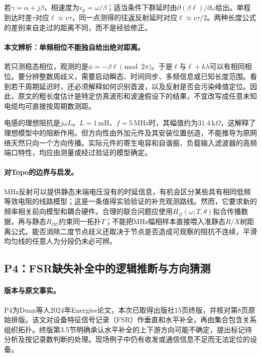 若$\gamma=\alpha+j\beta$，相速度为$v_p=\omega/\beta$；适当条件下群延时由$\partial(\beta\ell)/\partial\omega$给出。单程到达时差$\tau$对应$\ell\approx v\tau$，同一点测得的往返反射延时对应$\ell\approx v\tau/2$。两种长度公式的差别来自走过的距离不同，而不是经验修正。

\paragraph{本文辨析：单频相位不能独自给出绝对距离。}
若只测稳态相位，观测的是$\phi=-\beta\ell\pmod{2\pi}$。于是$\ell$与$\ell+k\lambda$可以有相同相位。要分辨整数周歧义，需要启动瞬态、时间同步、多频信息或已知长度范围。看到若干周期延迟时，还必须解释如何识别首波，以及反射是否会污染峰值定位。因此，原文的粗长度估计是特定仿真波形和波速假设下的结果，不宜改写成任意未知电缆均可直接按周期数测距。

电感的理想阻抗是$j\omega L$。$L=1$\,mH、$f=5$\,MHz时，其幅值约为$31.4$\,k$\Omega$，这解释了理想模型中的阻断作用。但方向性由外加元件及其安装位置创造，不能推导为原网络天然只向一个方向传播。实际元件的寄生电容和自谐振、负载输入滤波器的高频端口特性，均应由测量或经过验证的模型确定。

\paragraph{对Topo的边界与启发。}
MHz反射可以提供静态末端电压没有的时延信息，有机会区分某些具有相同低频等效电阻的线路模型；这是一条值得实验验证的补充观测路线。然而，它要求新的频率相关前向模型和耦合硬件。合理的联合问题应使用$H_{ij}(\omega;T,\theta)$拟合传播数据，再与静态$R_{\mathcal O\mathcal O}$约束同一拓扑$T$；不能把MHz幅相样本直接喂入准静态$R/X$树距离公式。能否消除二度节点歧义还取决于节点是否造成可观察的阻抗不连续，平滑均匀线的任意人为分段仍未必可辨。

\subsection{P4：FSR缺失补全中的逻辑推断与方向猜测}
\label{subsec:P4}

\paragraph{版本与原文事实。}
P4为Duan等人2024年Energies论文\citep{P4}，本次已取得出版社15页终版，并核对第8页原始排版。该文对设备特征信号记录（FSR）作垂直和水平补全，再由集合包含关系组织拓扑。终版第3.5节明确承认水平补全的上下游方向可能不确定，提出标记待分析及按记录数判断的处理。现场例子中仍有收发或通信信息不足而无法定位的设备。

